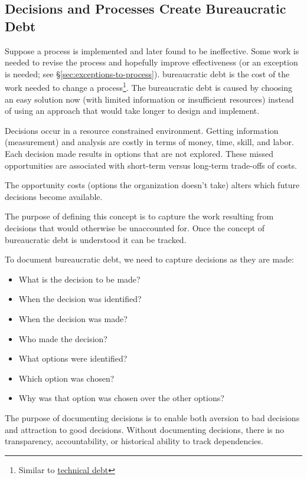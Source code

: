 \subsection{Decisions and Processes Create Bureaucratic Debt\label{sec:bureaucratic_debt}}


Suppose a \gls{process} is implemented and later found to be ineffective. Some work is needed to revise the process and hopefully improve effectiveness (or an exception is needed; see \S\ref{sec:exceptions-to-process}). \gls{bureaucratic debt} is the cost of the work needed to change a process\footnote{Similar to \href{https://en.wikipedia.org/wiki/Technical_debt}{technical debt}}. The bureaucratic debt is caused by choosing an easy solution now (with limited information or insufficient resources) instead of using an approach that would take longer to design and implement.


Decisions occur in a resource constrained environment.
Getting information (measurement) and analysis are costly in terms of money, time, skill, and labor.
Each decision made results in options that are not explored. These missed opportunities are associated with short-term versus long-term trade-offs of costs.

The opportunity costs (options the organization doesn't take) alters which future decisions become available.

The purpose of defining this concept is to capture the work resulting from decisions that would otherwise be unaccounted for.
Once the concept of bureaucratic debt is understood it can be tracked.

To document bureaucratic debt, we need to capture decisions as they are made:
\begin{itemize}
    \item What is the decision to be made?
    \item When the decision was identified?
    \item When the decision was made?
    \item Who made the decision?
    \item What options were identified?
    \item Which option was chosen?
    \item Why was that option was chosen over the other options?
\end{itemize}
The purpose of documenting decisions is to enable both aversion to bad decisions and attraction to good decisions. Without documenting decisions, there is no transparency, accountability, or historical ability to track dependencies. 

